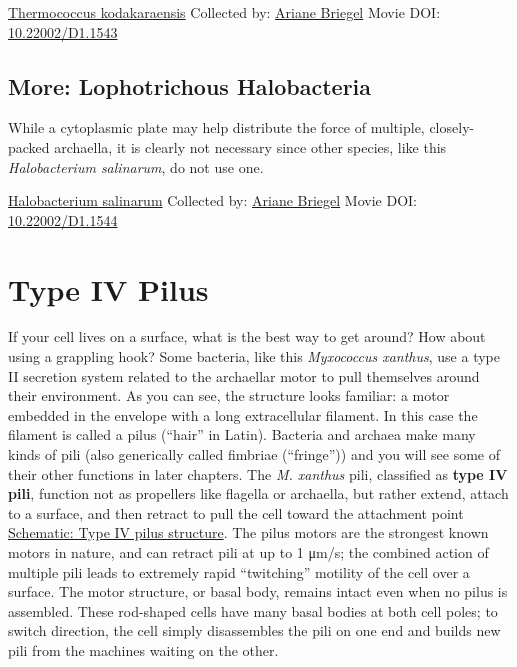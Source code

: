 \documentclass[]{tufte-book}
\begin{document}
\hypertarget{htmlwidget-5bb4ef99e5faba54cf6a}{}

\label{fig:6-9b}\protect\hyperlink{tree}{Thermococcus kodakaraensis} Collected by: \protect\hyperlink{ariane_briegel}{Ariane Briegel} Movie DOI: \href{https://doi.org/10.22002/D1.1543}{10.22002/D1.1543}

\hypertarget{Lophotrichous_Halobacteria}{%
\subsection*{More: Lophotrichous Halobacteria}\label{Lophotrichous_Halobacteria}}

While a cytoplasmic plate may help distribute the force of multiple, closely-packed archaella, it is clearly not necessary since other species, like this \emph{Halobacterium salinarum}, do not use one.



\hypertarget{htmlwidget-9aa4cdbffd7f204ed747}{}

\label{fig:6-9c}\protect\hyperlink{tree}{Halobacterium salinarum} Collected by: \protect\hyperlink{ariane_briegel}{Ariane Briegel} Movie DOI: \href{https://doi.org/10.22002/D1.1544}{10.22002/D1.1544}

\hypertarget{type-iv-pilus}{%
\section{Type IV Pilus}\label{type-iv-pilus}}

If your cell lives on a surface, what is the best way to get around? How about using a grappling hook? Some bacteria, like this \emph{Myxococcus xanthus}, use a type II secretion system related to the archaellar motor to pull themselves around their environment. As you can see, the structure looks familiar: a motor embedded in the envelope with a long extracellular filament. In this case the filament is called a pilus (``hair'' in Latin). Bacteria and archaea make many kinds of pili (also generically called fimbriae (``fringe'')) and you will see some of their other functions in later chapters. The \emph{M. xanthus} pili, classified as \textbf{type IV pili}, function not as propellers like flagella or archaella, but rather extend, attach to a surface, and then retract to pull the cell toward the attachment point \protect\hyperlink{Type_IV_pilus_structure}{Schematic: Type IV pilus structure}. The pilus motors are the strongest known motors in nature, and can retract pili at up to 1 μm/s; the combined action of multiple pili leads to extremely rapid ``twitching'' motility of the cell over a surface. The motor structure, or basal body, remains intact even when no pilus is assembled. These rod-shaped cells have many basal bodies at both cell poles; to switch direction, the cell simply disassembles the pili on one end and builds new pili from the machines waiting on the other.
\end{document}
